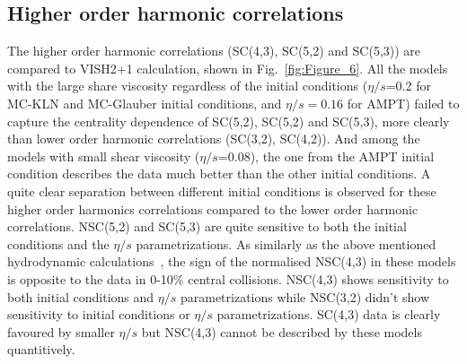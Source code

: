 \documentclass[ALICE,manyauthors]{cernphprep}
\begin{document}
\subsection{Higher order harmonic correlations}
The higher order harmonic correlations (SC(4,3), SC(5,2) and SC(5,3)) are compared to VISH2+1 calculation, shown in Fig.~\ref{fig:Figure_6}. 
All the models with the large share viscosity regardless of the initial conditions ($\eta/s$=0.2 for MC-KLN and MC-Glauber initial conditions, and $\eta/s = 0.16$ for AMPT) failed to capture the centrality dependence of SC(5,2), SC(5,2) and SC(5,3), more clearly than lower order harmonic correlations (SC(3,2), SC(4,2)).
And among the models with small shear viscosity ($\eta/s$=0.08), the one from the AMPT initial condition describes the data much better than the other initial conditions. 
A quite clear separation between different initial conditions is observed for these higher order harmonics correlations compared to the lower order harmonic correlations.
NSC(5,2) and SC(5,3) are quite sensitive to both the initial conditions and the $\eta/s$ parametrizations.
As similarly as the above mentioned hydrodynamic calculations~\cite{Niemi:2015qia}, the sign of the normalised NSC(4,3) in these models is opposite to the data in 0-10\% central collisions. NSC(4,3) shows sensitivity to both initial conditions and $\eta/s$ parametrizations while NSC(3,2) didn't show sensitivity to initial conditions or $\eta/s$ parametrizations.
SC(4,3) data is clearly favoured by smaller $\eta/s$ but NSC(4,3) cannot be described by these models quantitively.
     
\end{document}
